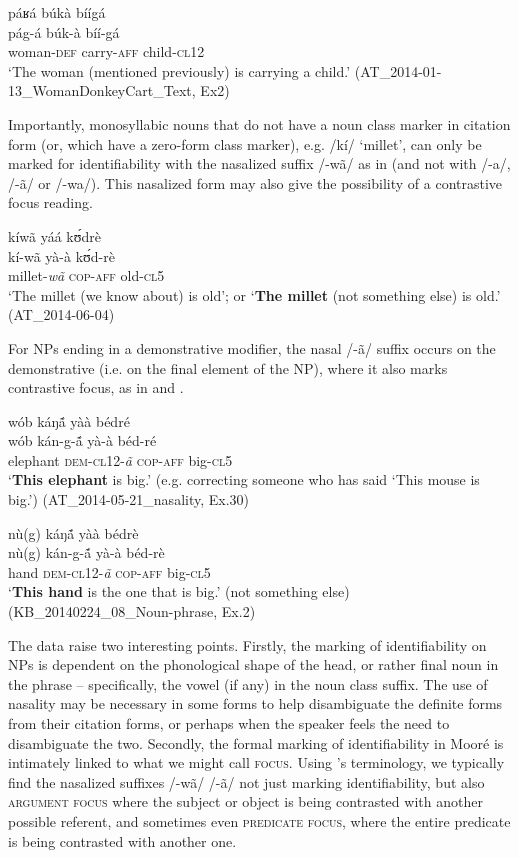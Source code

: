 \documentclass[output=paper]{langsci/langscibook}
\begin{document}
\ea\label{ex:teo:51}
\glll páʁá búkà bíígá\\
pág-á búk-à bíí-gá\\
woman-\textsc{def} carry-\textsc{aff} child-\textsc{cl12}\\
\glt ‘The woman (mentioned previously) is carrying a child.’ (AT\_2014-01-13\_WomanDonkeyCart\_Text, Ex2)
\z

Importantly, monosyllabic nouns that do not have a noun class marker in citation form (or, which have a zero-form class marker), e.g. /kí/ ‘millet’, can only be marked for identifiability with the nasalized suffix /-wã/ as in  (and not with /-a/, /-ã/ or /-wa/). This nasalized form may also give the possibility of a contrastive focus reading.

\ea\label{ex:teo:52}
\glll kíwã  yáá k\'ʊdrè\\
kí-wã  yà-à k\'ʊd-rè\\
millet-\textit{wã} \textsc{cop-aff} old-\textsc{cl5}\\
\glt ‘The millet (we know about) is old’; or ‘\textbf{The millet} (not something else) is old.’ (AT\_2014-06-04)
\z

For NPs ending in a demonstrative modifier, the nasal /-ã/ suffix occurs on the demonstrative (i.e. on the final element of the NP), where it also marks contrastive focus, as in  and .

\ea\label{ex:teo:53}
\glll wób káŋ\'{ã} yàà bédré\\
wób kán-g-\'{ã} yà-à béd-ré\\
elephant \textsc{dem-cl12}-\textit{ã} \textsc{cop-aff} big-\textsc{cl5}\\
\glt ‘\textbf{This elephant} is big.’ (e.g. correcting someone who has said ‘This mouse is big.’) (AT\_2014-05-21\_nasality, Ex.30)
\z

\ea\label{ex:teo:54}
\glll nù(g) káŋ\'{ã}  yàà bédrè\\
nù(g) kán-g-\'{ã}  yà-à béd-rè\\
hand \textsc{dem-cl12}-\textit{ã} \textsc{cop-aff} big-\textsc{cl5}\\
\glt ‘\textbf{This hand} is the one that is big.’ (not something else) (KB\_20140224\_08\_Noun-phrase, Ex.2)
\z

The data raise two interesting points. Firstly, the marking of identifiability on NPs is dependent on the phonological shape of the head, or rather final noun in the phrase – specifically, the vowel (if any) in the noun class suffix. The use of nasality may be necessary in some forms to help disambiguate the definite forms from their citation forms, or perhaps when the speaker feels the need to disambiguate the two. Secondly, the formal marking of identifiability in Mooré is intimately linked to what we might call \textsc{focus}. Using \cite{Lambrecht1994}'s terminology, we typically find the nasalized suffixes /-wã/ {\Tilde} /-ã/ not just marking identifiability, but also \textsc{argument focus} where the subject or object is being contrasted with another possible referent, and sometimes even \textsc{predicate focus}, where the entire predicate is being contrasted with another one.
\end{document}
